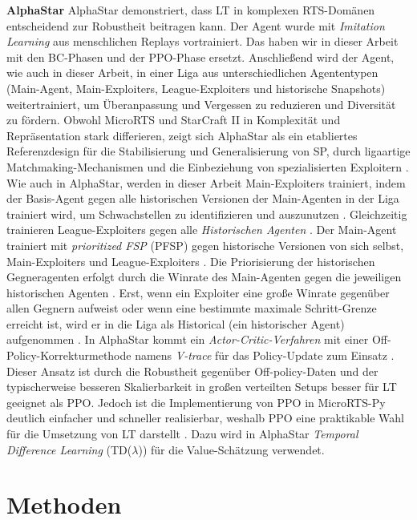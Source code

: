 \documentclass[10pt,twocolumn,letterpaper]{article}
\begin{document}
\noindent\textbf{AlphaStar}
\cite{vinyals2019alphastar} AlphaStar demonstriert, dass LT in komplexen RTS-Domänen entscheidend zur Robustheit beitragen kann. 
Der Agent wurde mit \emph{Imitation Learning} aus menschlichen Replays vortrainiert. Das haben wir in dieser Arbeit mit den BC-Phasen und der PPO-Phase ersetzt. 
Anschließend wird der Agent, wie auch in dieser Arbeit, in einer Liga aus unterschiedlichen Agententypen (Main-Agent, Main-Exploiters, League-Exploiters und historische Snapshots) weitertrainiert, um Überanpassung und Vergessen zu reduzieren und Diversität zu fördern. 
Obwohl MicroRTS und StarCraft II in Komplexität und Repräsentation stark differieren, zeigt sich AlphaStar als ein etabliertes Referenzdesign für die Stabilisierung und Generalisierung von SP, durch ligaartige Matchmaking-Mechanismen und die Einbeziehung von spezialisierten Exploitern \cite{vinyals2019alphastar}.
Wie auch in AlphaStar, werden in dieser Arbeit Main-Exploiters trainiert, indem der Basis-Agent gegen alle historischen Versionen der Main-Agenten in der Liga trainiert wird, um Schwachstellen zu identifizieren und auszunutzen \cite{vinyals2019alphastar}.
Gleichzeitig trainieren League-Exploiters gegen alle \emph{Historischen Agenten} \cite{vinyals2019alphastar}.
Der Main-Agent trainiert mit \emph{prioritized FSP} (PFSP) gegen historische Versionen von sich selbst, Main-Exploiters und League-Exploiters \cite{vinyals2019alphastar}.
Die Priorisierung der historischen Gegneragenten erfolgt durch die Winrate des Main-Agenten gegen die jeweiligen historischen Agenten \cite{vinyals2019alphastar}.
Erst, wenn ein Exploiter eine große Winrate gegenüber allen Gegnern aufweist oder wenn eine bestimmte maximale Schritt-Grenze erreicht ist, wird er in die Liga als Historical (ein historischer Agent) aufgenommen \cite{vinyals2019alphastar}. 
In AlphaStar kommt ein \emph{Actor-Critic-Verfahren} mit einer Off-Policy-Korrekturmethode namens \emph{V-trace} für das Policy-Update zum Einsatz \cite{espeholt2018impala, vinyals2019alphastar}. 
Dieser Ansatz ist durch die Robustheit gegenüber Off-policy-Daten und der typischerweise besseren Skalierbarkeit in großen verteilten Setups besser für LT geeignet als PPO. 
Jedoch ist die Implementierung von PPO in MicroRTS-Py deutlich einfacher und schneller realisierbar, weshalb PPO eine praktikable Wahl für die Umsetzung von LT darstellt \cite{vinyals2019alphastar}.
Dazu wird in AlphaStar \emph{Temporal Difference Learning} (TD($\lambda$)) \cite{suttonbarto1998rl} für die Value-Schätzung verwendet.
\section{Methoden}
\label{sec:Methoden}
\end{document}
